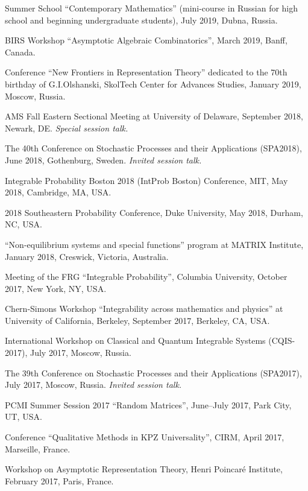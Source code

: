 \documentclass[letterpaper,11pt]{article}
\begin{document}
\begin{etaremune}
	\item  
		Summer School ``Contemporary Mathematics'' (mini-course in Russian for 
		high school and beginning undergraduate students), 
		July 2019, Dubna, Russia.
	\item
		BIRS Workshop ``Asymptotic Algebraic Combinatorics'',
		March 2019, Banff, Canada.
	\item Conference ``New Frontiers in Representation Theory'' dedicated to the 70th birthday of G.I.Olshanski, SkolTech Center for Advances Studies, January 2019, Moscow, Russia.
\item AMS Fall Eastern Sectional Meeting
	at University of Delaware,
	September 2018, Newark, DE.
		\emph{Special session talk.}
	\item
    The 40th Conference on Stochastic Processes and their
    Applications (SPA2018), June 2018, 
		Gothenburg, Sweden.
		\emph{Invited session talk.}
	\item
		Integrable Probability Boston 2018 (IntProb Boston)
		Conference, 
		MIT,
		May 2018, 
		Cambridge, MA, USA.
	\item
		2018 Southeastern Probability Conference,
		Duke University, 
		May 2018,
		Durham, NC, USA.
	\item 
		``Non-equilibrium systems and special functions'' program at MATRIX Institute, 
		January 2018, 
		Creswick, Victoria, Australia.
	\item 
		Meeting of the 
		FRG ``Integrable Probability'', Columbia University,
		October 2017, New York, NY, USA.

	\item Chern-Simons Workshop
		``Integrability across mathematics and physics'' 
		 at University of California, Berkeley,
			September 2017, Berkeley, CA, USA.
	\item
	      International Workshop on Classical and Quantum Integrable
	      Systems (CQIS-2017), July 2017, Moscow, Russia.
	\item
	      The 39th Conference on Stochastic Processes and their
	      Applications (SPA2017), July 2017, Moscow, Russia.
				\emph{Invited session talk.}

	\item
	      PCMI Summer Session 2017 ``Random Matrices'', June--July 2017,
	      Park City, UT, USA.

	\item
	      Conference ``Qualitative Methods in KPZ Universality'', CIRM,
	      April 2017, Marseille, France.

	\item
	      Workshop on Asymptotic Representation Theory, Henri Poincar\'e
	      Institute, February 2017, Paris, France.


\end{etaremune}
\end{document}
